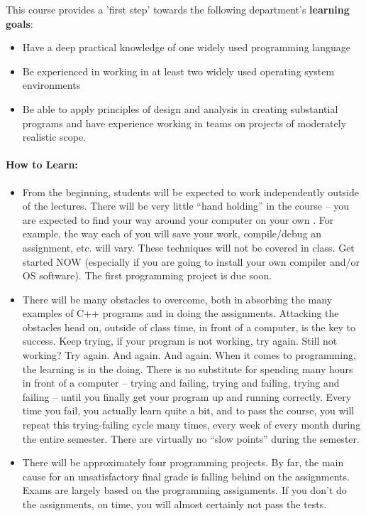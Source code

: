 \documentclass[10pt]{article}
\begin{document}
This course provides a 'first step' towards the
following department's {\bf learning goals}:
\begin{itemize}
\item
  Have a deep practical knowledge of one widely used programming
  language
\item
  Be experienced in working in at least two widely used operating
  system environments
\item
  Be able to apply principles of design and analysis in creating
  substantial programs and have experience working in teams on
  projects of moderately realistic scope.
\end{itemize}

\paragraph*{\bf How to Learn:}
\begin{itemize}
\item

  From the beginning, students will be expected to work independently 
  outside of the lectures. 
  There will be very little ``hand holding'' in the course -- you are 
  expected to find your way around your computer on your own . 
  For example, the way each of you will save your work, compile/debug
  an assignment, etc. will vary. 
  These techniques will not be covered in class. 
  Get started NOW
  (especially if you are going to install your own compiler and/or OS
  software). 
  The first programming project is due soon.
\item
  There will be many obstacles to overcome, both in absorbing the many 
  examples of C++ programs and in doing the assignments. 
  Attacking the obstacles head on, outside of class time, in front of
  a computer, is the key to success.  
  Keep trying, if your program is not working, try again.  
  Still not working? Try again.  And again.  And again. 
  When it comes to programming, the learning is in the doing. 
  There is no substitute for spending many hours in front of a
  computer -- trying and failing, trying and failing, trying and
  failing -- until you finally get your program up and running
  correctly. 
  Every time you fail, you actually learn quite a bit, and to pass the
  course, you will repeat this trying-failing cycle many times, every
  week of every month during the entire semester. 
  There are virtually no ``slow points'' during the semester.
\item
  There will be approximately four programming projects. 
  By far, the main cause for an unsatisfactory final grade is falling
  behind on the assignments. 
  Exams are largely based on the programming assignments. 
  If you don't do the assignments, on time, you will almost certainly
  not pass the tests.
 \end{itemize}
\end{document}
